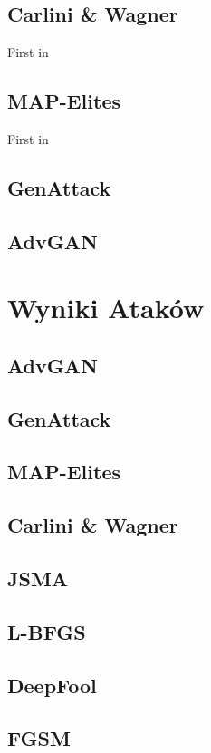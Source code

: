 \documentclass{article}
\begin{document}
\subsection{Carlini & Wagner}
First in \cite{DBLP:journals/corr/CarliniW16a}

\subsection{MAP-Elites}
First in \cite{DBLP:journals/corr/NguyenYC14}

\subsection{GenAttack}

\subsection{AdvGAN}


\section{Wyniki Ataków}\label{comparison}
\subsection{AdvGAN}
\subsection{GenAttack}
\subsection{MAP-Elites}
\subsection{Carlini & Wagner}
\subsection{JSMA}
\subsection{L-BFGS}
\subsection{DeepFool}
\subsection{FGSM}
\end{document}
